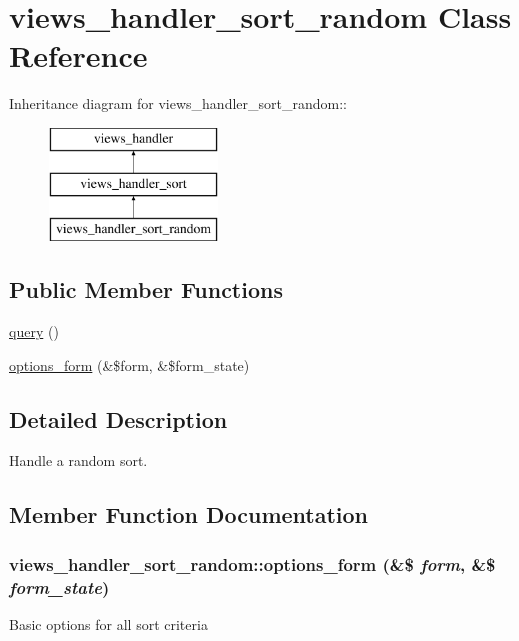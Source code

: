 \hypertarget{classviews__handler__sort__random}{
\section{views\_\-handler\_\-sort\_\-random Class Reference}
\label{classviews__handler__sort__random}
}
Inheritance diagram for views\_\-handler\_\-sort\_\-random::\begin{figure}[H]
\begin{center}
\leavevmode
\includegraphics[height=3cm]{classviews__handler__sort__random}
\end{center}
\end{figure}
\subsection*{Public Member Functions}
\begin{DoxyCompactItemize}
\item 
\hyperlink{classviews__handler__sort__random_aeaf6fcc03c9d1a0f86a77b9e5314229a}{query} ()
\item 
\hyperlink{classviews__handler__sort__random_a51a854154f820622661702ec10532cdb}{options\_\-form} (\&\$form, \&\$form\_\-state)
\end{DoxyCompactItemize}


\subsection{Detailed Description}
Handle a random sort. 

\subsection{Member Function Documentation}
\hypertarget{classviews__handler__sort__random_a51a854154f820622661702ec10532cdb}{
\subsubsection[{options\_\-form}]{\setlength{\rightskip}{0pt plus 5cm}views\_\-handler\_\-sort\_\-random::options\_\-form (\&\$ {\em form}, \/  \&\$ {\em form\_\-state})}}
\label{classviews__handler__sort__random_a51a854154f820622661702ec10532cdb}
Basic options for all sort criteria 

